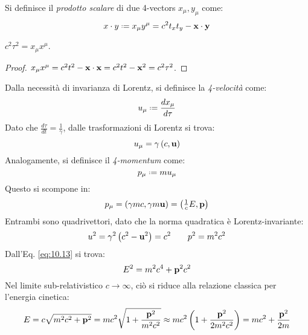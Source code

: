 \begin{definition}
	Si definisce il \textit{prodotto scalare} di due 4-vectors $ x_{\mu},y_{\mu} $ come:
	\begin{equation}
		x \cdot y \defeq x_{\mu} y^{\mu} = c^2 t_x t_y - \ve{x} \cdot \ve{y}
		\label{eq:10.9}
	\end{equation}
\end{definition}

\begin{proposition}
	$ c^2 \tau^2 = x_{\mu} x^{\mu} $.
\end{proposition}
\begin{proof}
	$ x_{\mu} x^{\mu} = c^2 t^2 - \mathbf{x} \cdot \mathbf{x} = c^2 t^2 - \mathbf{x}^2 = c^2 \tau^2 $.
\end{proof}

Dalla necessità di invarianza di Lorentz, si definisce la \textit{4-velocità} come:
\begin{equation}
	u_{\mu} \defeq \frac{dx_{\mu}}{d\tau}
	\label{eq:10.10}
\end{equation}
Dato che $ \frac{d\tau}{dt} = \frac{1}{\gamma} $, dalle trasformazioni di Lorentz si trova:
\begin{equation}
	u_{\mu} = \gamma \left( c, \mathbf{u} \right)
	\label{eq:10.11}
\end{equation}
Analogamente, si definisce il \textit{4-momentum} come:
\begin{equation}
	p_{\mu} \defeq m u_{\mu}
	\label{eq:10.12}
\end{equation}
Questo si scompone in:
\begin{equation}
	p_{\mu} = \left( \gamma m c, \gamma m \mathbf{u} \right) = \left( \tfrac{1}{c} E, \mathbf{p} \right)
	\label{eq:10.13}
\end{equation}
Entrambi sono quadrivettori, dato che la norma quadratica è Lorentz-invariante:
\begin{equation*}
	u^2 = \gamma^2 \left( c^2 - \mathbf{u}^2 \right) = c^2
	\qquad
	p^2 = m^2 c^2
\end{equation*}
Dall'Eq. \ref{eq:10.13} si trova:
\begin{equation}
	E^2 = m^2 c^4 + \mathbf{p}^2 c^2
	\label{eq:10.14}
\end{equation}
Nel limite sub-relativistico $ c \rightarrow \infty $, ciò si riduce alla relazione classica per l'energia cinetica:
\begin{equation*}
	E = c \sqrt{m^2 c^2 + \mathbf{p}^2} = mc^2 \sqrt{1 + \frac{\mathbf{p}^2}{m^2 c^2}} \approx mc^2 \left( 1 + \frac{\mathbf{p}^2}{2m^2 c^2} \right) = mc^2 + \frac{\mathbf{p}^2}{2m}
\end{equation*}

